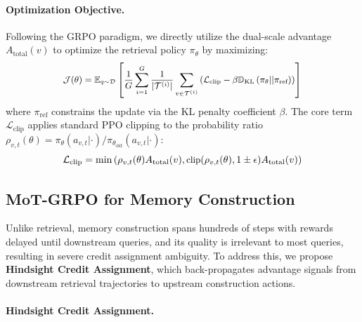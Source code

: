 \documentclass[11pt, a4paper]{lumia}
\begin{document}
\paragraph{Optimization Objective.}
Following the GRPO paradigm, we directly utilize the dual-scale advantage $A_{\text{total}}(v)$ to optimize the retrieval policy $\pi_{\theta}$ by maximizing:
\begin{equation}
\small
\begin{aligned}
\mathcal{J}(\theta) = \mathbb{E}_{q \sim \mathcal{D}} \left[ \frac{1}{G} \sum_{i=1}^G \frac{1}{|\mathcal{T}^{(i)}|} \sum_{v \in \mathcal{T}^{(i)}} \left( \mathcal{L}_{\text{clip}}
- \beta \mathbb{D}_{\text{KL}} \left( \pi_{\theta} || \pi_{\text{ref}} \right) \right) \right]
\end{aligned}
\end{equation}
where $\pi_{\text{ref}}$ constrains the update via the KL penalty coefficient $\beta$. The core term $\mathcal{L}_{\text{clip}}$ applies standard PPO clipping to the probability ratio $\rho_{v,t}(\theta) = \pi_{\theta}(a_{v,t} | \cdot) / \pi_{\theta_{\text{old}}}(a_{v,t} | \cdot)$:
\begin{equation}
\small
\mathcal{L}_{\text{clip}} = \min \left(\rho_{v,t}(\theta) A_{\text{total}}(v), \text{clip}(\rho_{v,t}(\theta), 1\pm\epsilon) A_{\text{total}}(v) \right)
\end{equation}

\subsection{MoT-GRPO for Memory Construction}
Unlike retrieval, memory construction spans hundreds of steps with rewards delayed until downstream queries, and its quality is irrelevant to most queries, resulting in severe credit assignment ambiguity.
To address this, we propose \textbf{Hindsight Credit Assignment}, which back-propagates advantage signals from downstream retrieval trajectories to upstream construction actions.

\paragraph{Hindsight Credit Assignment.}
\end{document}
